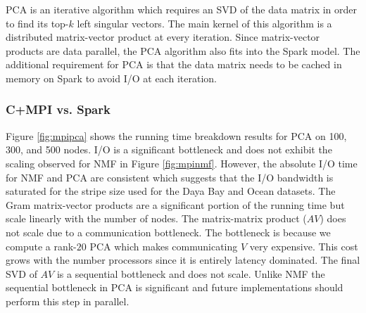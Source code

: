 PCA is an iterative algorithm which requires an SVD of the data matrix in order to find its top-$k$ left singular vectors. The main kernel of this algorithm is a distributed matrix-vector product at every iteration. Since matrix-vector products are data parallel, the PCA algorithm also fits into the Spark model. The additional requirement for PCA is that the data matrix needs to be cached in memory on Spark to avoid I/O at each iteration.

\subsubsection{C+MPI vs. Spark}
Figure \ref{fig:mpipca} shows the running time breakdown results for PCA on 100, 300, and 500 nodes. I/O is a significant bottleneck and does not exhibit the scaling observed for NMF in Figure \ref{fig:mpinmf}. However, the absolute I/O time for NMF and PCA are consistent which suggests that the I/O bandwidth is saturated for the stripe size used for the Daya Bay and Ocean datasets. The Gram matrix-vector products are a significant portion of the running time but scale linearly with the number of nodes. The matrix-matrix product ($AV$) does not scale due to a communication bottleneck. The bottleneck is because we compute a rank-$20$ PCA which makes communicating $V$ very expensive. This cost grows with the number processors since it is entirely latency dominated. The final SVD of $AV$ is a sequential bottleneck and does not scale. Unlike NMF the sequential bottleneck in PCA is significant and future implementations should perform this step in parallel.

